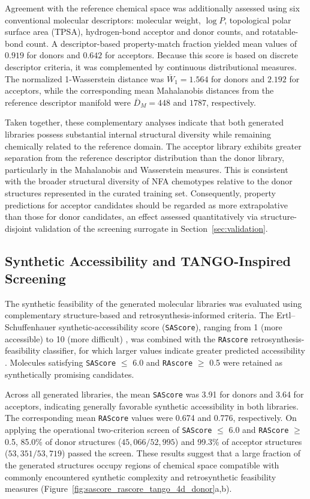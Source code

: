 \documentclass[12pt]{article}
\begin{document}
Agreement with the reference chemical space was additionally assessed using six conventional molecular descriptors: molecular weight, $\log P$, topological polar surface area (TPSA), hydrogen-bond acceptor and donor counts, and rotatable-bond count. A descriptor-based property-match fraction yielded mean values of $0.919$ for donors and $0.642$ for acceptors. Because this score is based on discrete descriptor criteria, it was complemented by continuous distributional measures. The normalized 1-Wasserstein distance was $\overline{W}_1 = 1.564$ for donors and $2.192$ for acceptors, while the corresponding mean Mahalanobis distances from the reference descriptor manifold were $\overline{D}_M = 448$ and $1787$, respectively.

Taken together, these complementary analyses indicate that both generated libraries possess substantial internal structural diversity while remaining chemically related to the reference domain. The acceptor library exhibits greater separation from the reference descriptor distribution than the donor library, particularly in the Mahalanobis and Wasserstein measures. This is consistent with the broader structural diversity of NFA chemotypes relative to the donor structures represented in the curated training set. Consequently, property predictions for acceptor candidates should be regarded as more extrapolative than those for donor candidates, an effect assessed quantitatively via structure-disjoint validation of the screening surrogate in Section~\ref{sec:validation}.

\subsection{Synthetic Accessibility and TANGO-Inspired Screening}
The synthetic feasibility of the generated molecular libraries was evaluated using complementary structure-based and retrosynthesis-informed criteria. The Ertl--Schuffenhauer synthetic-accessibility score (\texttt{SAScore}), ranging from 1 (more accessible) to 10 (more difficult) \cite{sascore}, was combined with the \texttt{RAscore} retrosynthesis-feasibility classifier, for which larger values indicate greater predicted accessibility \cite{rascore}. Molecules satisfying \texttt{SAScore} $\leq$ 6.0 and \texttt{RAscore} $\geq$ 0.5 were retained as synthetically promising candidates.

Across all generated libraries, the mean \texttt{SAScore} was 3.91 for donors and 3.64 for acceptors, indicating generally favorable synthetic accessibility in both libraries. The corresponding mean \texttt{RAScore} values were 0.674 and 0.776, respectively. On applying the operational two-criterion screen of \texttt{SAScore} $\leq$ 6.0 and \texttt{RAScore} $\geq$ 0.5, 85.0\% of donor structures ($45{,}066/52{,}995$) and 99.3\% of acceptor structures ($53{,}351/53{,}719$) passed the screen. These results suggest that a large fraction of the generated structures occupy regions of chemical space compatible with commonly encountered synthetic complexity and retrosynthetic feasibility measures (Figure~\ref{fig:sascore_rascore_tango_4d_donor}a,b).
\end{document}
